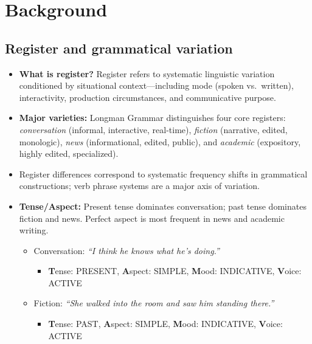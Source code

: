 \documentclass[11pt]{article}
\begin{document}
\section{Background}
\subsection{Register and grammatical variation}
\begin{itemize}
  \item \textbf{What is register?} Register refers to systematic linguistic variation conditioned by situational context---including mode (spoken vs.\ written), interactivity, production circumstances, and communicative purpose. \citep{Biber20101999LongmanEnglish}
  \item \textbf{Major varieties:} Longman Grammar distinguishes four core registers: \emph{conversation} (informal, interactive, real-time), \emph{fiction} (narrative, edited, monologic), \emph{news} (informational, edited, public), and \emph{academic} (expository, highly edited, specialized). \citep{Biber20101999LongmanEnglish}
  \item Register differences correspond to systematic frequency shifts in grammatical constructions; verb phrase systems are a major axis of variation. \citep{Biber20101999LongmanEnglish}
  \item \textbf{Tense/Aspect:} Present tense dominates conversation; past tense dominates fiction and news. Perfect aspect is most frequent in news and academic writing. \citep{Biber20101999LongmanEnglish}
    \begin{itemize}
      \item Conversation: \emph{``I think he knows what he's doing.''}
      \begin{itemize}
        \item \textbf{T}ense: PRESENT, \textbf{A}spect: SIMPLE, \textbf{M}ood: INDICATIVE, \textbf{V}oice: ACTIVE
      \end{itemize}
      \item Fiction: \emph{``She walked into the room and saw him standing there.''}
      \begin{itemize}
        \item \textbf{T}ense: PAST, \textbf{A}spect: SIMPLE, \textbf{M}ood: INDICATIVE, \textbf{V}oice: ACTIVE
      \end{itemize}

\end{itemize}
\end{itemize}
\end{document}
